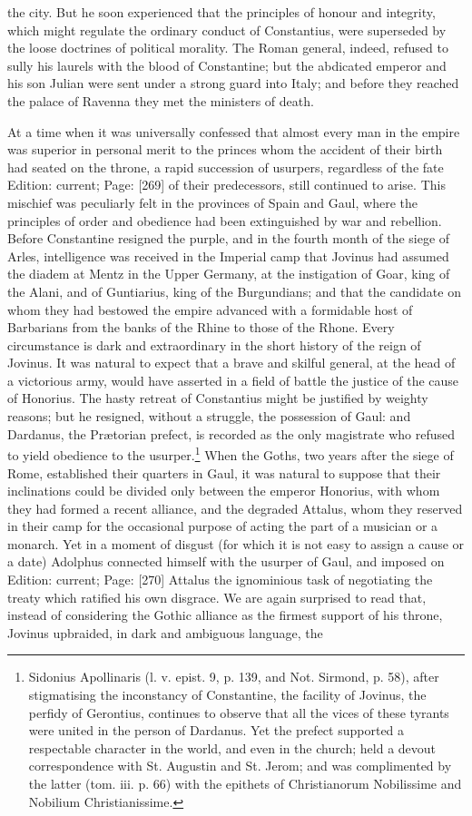 the city. But he soon experienced that the principles of honour and integrity, which might regulate the ordinary conduct of Constantius, were superseded by the loose doctrines of political morality. The Roman general, indeed, refused to sully his laurels with the blood of Constantine; but the abdicated emperor and his son Julian were sent under a strong guard into Italy; and before they reached the palace of Ravenna they met the ministers of death.

At a time when it was universally confessed that almost every man in the empire was superior in personal merit to the princes whom the accident of their birth had seated on the throne, a rapid succession of usurpers, regardless of the fate Edition: current; Page: [269] of their predecessors, still continued to arise. This mischief was peculiarly felt in the provinces of Spain and Gaul, where the principles of order and obedience had been extinguished by war and rebellion. Before Constantine resigned the purple, and in the fourth month of the siege of Arles, intelligence was received in the Imperial camp that Jovinus had assumed the diadem at Mentz in the Upper Germany, at the instigation of Goar, king of the Alani, and of Guntiarius, king of the Burgundians; and that the candidate on whom they had bestowed the empire advanced with a formidable host of Barbarians from the banks of the Rhine to those of the Rhone. Every circumstance is dark and extraordinary in the short history of the reign of Jovinus. It was natural to expect that a brave and skilful general, at the head of a victorious army, would have asserted in a field of battle the justice of the cause of Honorius. The hasty retreat of Constantius might be justified by weighty reasons; but he resigned, without a struggle, the possession of Gaul: and Dardanus, the Prætorian prefect, is recorded as the only magistrate who refused to yield obedience to the usurper.\footnote{Sidonius Apollinaris (l. v. epist. 9, p. 139, and Not. Sirmond, p. 58), after stigmatising the inconstancy of Constantine, the facility of Jovinus, the perfidy of Gerontius, continues to observe that all the vices of these tyrants were united in the person of Dardanus. Yet the prefect supported a respectable character in the world, and even in the church; held a devout correspondence with St. Augustin and St. Jerom; and was complimented by the latter (tom. iii. p. 66) with the epithets of Christianorum Nobilissime and Nobilium Christianissime.} When the Goths, two years after the siege of Rome, established their quarters in Gaul, it was natural to suppose that their inclinations could be divided only between the emperor Honorius, with whom they had formed a recent alliance, and the degraded Attalus, whom they reserved in their camp for the occasional purpose of acting the part of a musician or a monarch. Yet in a moment of disgust (for which it is not easy to assign a cause or a date) Adolphus connected himself with the usurper of Gaul, and imposed on Edition: current; Page: [270] Attalus the ignominious task of negotiating the treaty which ratified his own disgrace. We are again surprised to read that, instead of considering the Gothic alliance as the firmest support of his throne, Jovinus upbraided, in dark and ambiguous language, the 